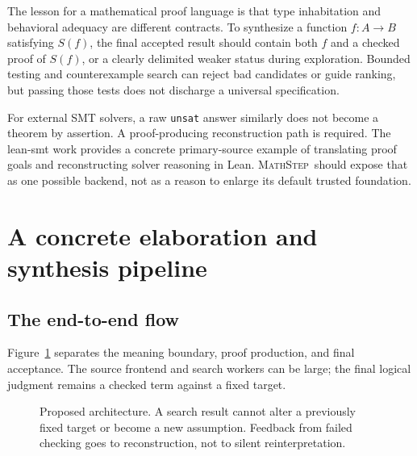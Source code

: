 \documentclass[11pt,a4paper]{article}
\theoremstyle{remark}
\newcommand{\ms}{\textsc{MathStep}}
\newcommand{\ty}[1]{\texttt{#1}}
\begin{document}
The lesson for a mathematical proof language is that type inhabitation and behavioral adequacy are different contracts. To synthesize a function $f:A\to B$ satisfying $S(f)$, the final accepted result should contain both $f$ and a checked proof of $S(f)$, or a clearly delimited weaker status during exploration. Bounded testing and counterexample search can reject bad candidates or guide ranking, but passing those tests does not discharge a universal specification.

For external SMT solvers, a raw \ty{unsat} answer similarly does not become a theorem by assertion. A proof-producing reconstruction path is required. The lean-smt work provides a concrete primary-source example of translating proof goals and reconstructing solver reasoning in Lean.\cite{lean-smt} \ms\ should expose that as one possible backend, not as a reason to enlarge its default trusted foundation.

\section{A concrete elaboration and synthesis pipeline}\label{sec:pipeline}

\subsection{The end-to-end flow}
Figure~\ref{fig:pipeline} separates the meaning boundary, proof production, and final acceptance. The source frontend and search workers can be large; the final logical judgment remains a checked term against a fixed target.

\begin{figure}[htbp]
\centering
{}
\caption{Proposed architecture. A search result cannot alter a previously fixed target or become a new assumption. Feedback from failed checking goes to reconstruction, not to silent reinterpretation.}\label{fig:pipeline}
\end{figure}
\end{document}
